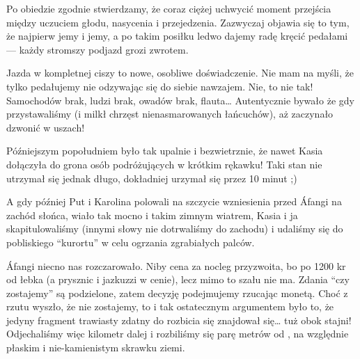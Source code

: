 Po obiedzie zgodnie stwierdzamy, że coraz ciężej uchwycić moment przejścia między uczuciem głodu, nasycenia i przejedzenia. Zazwyczaj objawia się to tym, że najpierw jemy i jemy, a po takim posiłku ledwo dajemy radę kręcić pedałami --- każdy stromszy podjazd grozi zwrotem.


Jazda w kompletnej ciszy to nowe, osobliwe doświadczenie. Nie mam na myśli, że tylko pedałujemy nie odzywając się do siebie nawzajem. Nie, to nie tak! Samochodów brak, ludzi brak, owadów brak, flauta… Autentycznie bywało że gdy przystawaliśmy (i milkł chrzęst nienasmarowanych łańcuchów), aż zaczynało dzwonić w uszach!

Późniejszym popołudniem było tak upalnie i bezwietrznie, że nawet Kasia dołączyła do grona osób podróżujących w krótkim rękawku! Taki stan nie utrzymał się jednak długo, dokładniej urzymał się przez 10 minut ;)

A gdy później Put i Karolina polowali na szczycie wzniesienia przed Áfangi na zachód słońca, wiało tak mocno i takim zimnym wiatrem, Kasia i ja skapitulowaliśmy (innymi słowy nie dotrwaliśmy do zachodu) i udaliśmy się do pobliskiego “kurortu” w celu ogrzania zgrabiałych palców.

Áfangi niecno nas rozczarowało. Niby cena za nocleg przyzwoita, bo po 1200 kr od łebka (a prysznic i jazkuzzi w cenie), lecz mimo to szału nie ma. Zdania “czy zostajemy” są podzielone, zatem decyzję podejmujemy rzucając monetą. Choć z rzutu wyszło, że nie zostajemy, to i tak ostatecznym argumentem było to, że jedyny fragment trawiasty zdatny do rozbicia się znajdował się… tuż obok stajni! Odjechaliśmy więc kilometr dalej i rozbiliśmy się parę metrów od , na względnie płaskim i nie-kamienistym skrawku ziemi.

